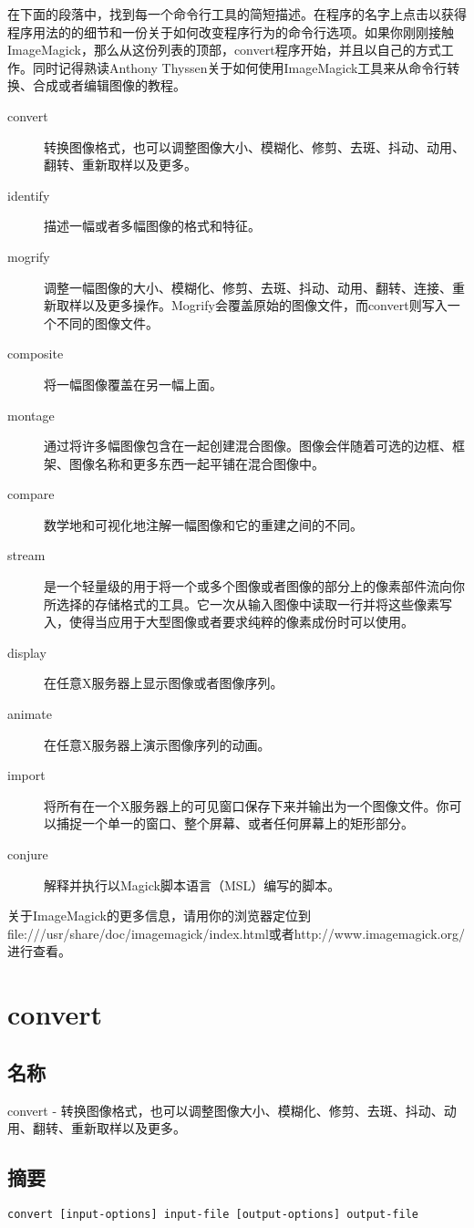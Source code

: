 \documentclass{article}
\begin{document}
\begin{CJK*}{UTF8}{gbsn}
在下面的段落中，找到每一个命令行工具的简短描述。在程序的名字上点击以获得程序用法的的细节和一份关于如何改变程序行为的命令行选项。如果你刚刚接触ImageMagick，那么从这份列表的顶部，convert程序开始，并且以自己的方式工作。同时记得熟读Anthony Thyssen关于如何使用ImageMagick工具来从命令行转换、合成或者编辑图像的教程。
\begin{description}
\item[convert] 转换图像格式，也可以调整图像大小、模糊化、修剪、去斑、抖动、动用、翻转、重新取样以及更多。
\item[identify] 描述一幅或者多幅图像的格式和特征。
\item[mogrify] 调整一幅图像的大小、模糊化、修剪、去斑、抖动、动用、翻转、连接、重新取样以及更多操作。Mogrify会覆盖原始的图像文件，而convert则写入一个不同的图像文件。
\item[composite] 将一幅图像覆盖在另一幅上面。
\item[montage] 通过将许多幅图像包含在一起创建混合图像。图像会伴随着可选的边框、框架、图像名称和更多东西一起平铺在混合图像中。
\item[compare] 数学地和可视化地注解一幅图像和它的重建之间的不同。
\item[stream] 是一个轻量级的用于将一个或多个图像或者图像的部分上的像素部件流向你所选择的存储格式的工具。它一次从输入图像中读取一行并将这些像素写入，使得当应用于大型图像或者要求纯粹的像素成份时可以使用。
\item[display] 在任意X服务器上显示图像或者图像序列。
\item[animate] 在任意X服务器上演示图像序列的动画。
\item[import] 将所有在一个X服务器上的可见窗口保存下来并输出为一个图像文件。你可以捕捉一个单一的窗口、整个屏幕、或者任何屏幕上的矩形部分。
\item[conjure] 解释并执行以Magick脚本语言（MSL）编写的脚本。
\end{description}
关于ImageMagick的更多信息，请用你的浏览器定位到file:///usr/share/doc/imagemagick/index.html或者http://www.imagemagick.org/进行查看。
\section{convert}
\subsection{名称}
convert - 转换图像格式，也可以调整图像大小、模糊化、修剪、去斑、抖动、动用、翻转、重新取样以及更多。
\subsection{摘要}
\verb|convert [input-options] input-file [output-options] output-file|

\end{CJK*}
\end{document}

